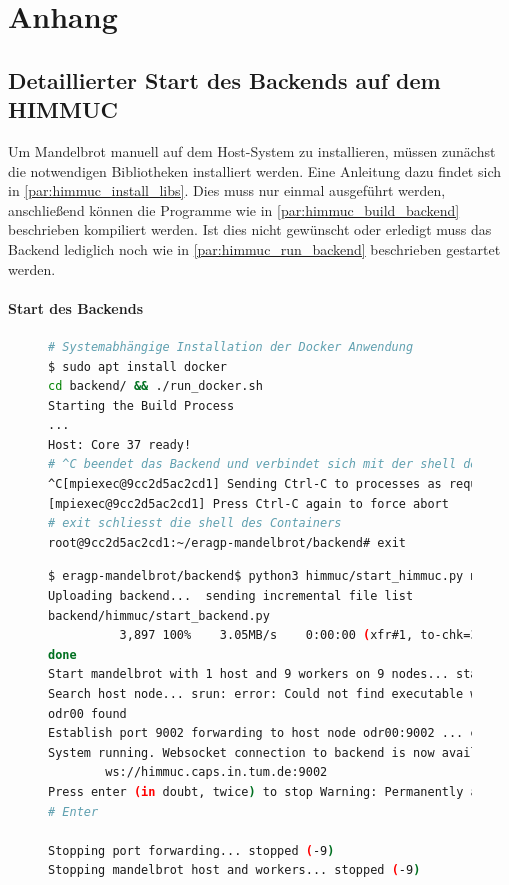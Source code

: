 
\section{Anhang}

\subsection{Detaillierter Start des Backends auf dem HIMMUC}\label{par:detailed_himmuc}

Um Mandelbrot manuell auf dem Host-System zu installieren,
müssen zunächst die notwendigen Bibliotheken installiert werden.
Eine Anleitung dazu findet sich in \autoref{par:himmuc_install_libs}.
Dies muss nur einmal ausgeführt werden, anschließend können die
Programme wie in \autoref{par:himmuc_build_backend} beschrieben kompiliert werden.
Ist dies nicht gewünscht oder erledigt muss das Backend lediglich noch wie
in \autoref{par:himmuc_run_backend} beschrieben gestartet werden.

\paragraph{Start des Backends}
\begin{figure}[h!]
	\begin{lstlisting}[language=bash, caption={Starten der Entwicklungsumbegung des Backends}]
# Systemabhängige Installation der Docker Anwendung
$ sudo apt install docker
cd backend/ && ./run_docker.sh
Starting the Build Process
...
Host: Core 37 ready!
# ^C beendet das Backend und verbindet sich mit der shell des Containers
^C[mpiexec@9cc2d5ac2cd1] Sending Ctrl-C to processes as requested
[mpiexec@9cc2d5ac2cd1] Press Ctrl-C again to force abort
# exit schliesst die shell des Containers
root@9cc2d5ac2cd1:~/eragp-mandelbrot/backend# exit
        \end{lstlisting}
\end{figure}

\begin{figure}
	\begin{lstlisting}[language=bash, caption={Beispielausgabe bei Start der Entwicklungsumbegung auf dem HimMUC}, label={shell:start_himmuc_example_anhang}]
$ eragp-mandelbrot/backend$ python3 himmuc/start_himmuc.py muendler 10 9
Uploading backend...  sending incremental file list
backend/himmuc/start_backend.py
          3,897 100%    3.05MB/s    0:00:00 (xfr#1, to-chk=35/62)
done
Start mandelbrot with 1 host and 9 workers on 9 nodes... started mandelbrot
Search host node... srun: error: Could not find executable worker
odr00 found
Establish port 9002 forwarding to host node odr00:9002 ... established
System running. Websocket connection to backend is now available at
        ws://himmuc.caps.in.tum.de:9002
Press enter (in doubt, twice) to stop Warning: Permanently added the ED25519 host key for IP address '10.42.0.54' to the list of known hosts.
# Enter

Stopping port forwarding... stopped (-9)
Stopping mandelbrot host and workers... stopped (-9)
    \end{lstlisting}
\end{figure}

